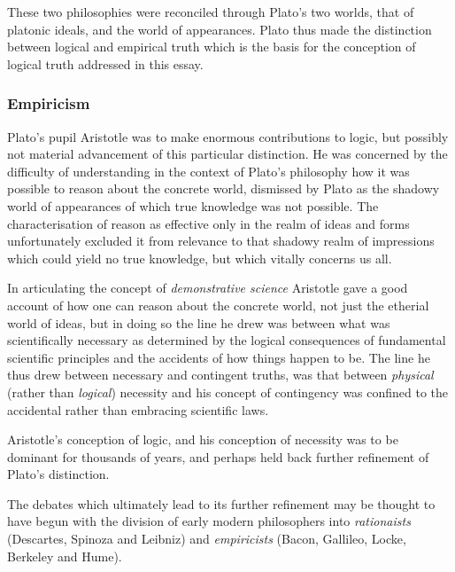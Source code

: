 \documentclass[10pt,titlepage]{article}
\begin{document}
These two philosophies were reconciled through Plato's two worlds, that of platonic ideals, and the world of appearances.
Plato thus made the distinction between logical and empirical truth which is the basis for the conception of logical truth addressed in this essay.

\subsubsection{Empiricism}

Plato's pupil Aristotle was to make enormous contributions to logic, but possibly not material advancement of this particular distinction.
He was concerned by the difficulty of understanding in the context of Plato's philosophy how it was possible to reason about the concrete world, dismissed by Plato as the shadowy world of appearances of which true knowledge was not possible.
The characterisation of reason as effective only in the realm of ideas and forms unfortunately excluded it from relevance to that shadowy realm of impressions which could yield no true knowledge, but which vitally concerns us all.

In articulating the concept of \emph{demonstrative science} Aristotle gave a good account of how one can reason about the concrete world, not just the etherial world of ideas, but in doing so the line he drew was between what was scientifically necessary as determined by the logical consequences of fundamental scientific principles and the accidents of how things happen to be.
The line he thus drew between necessary and contingent truths, was that between \emph{physical} (rather than \emph{logical}) necessity and his concept of contingency was confined to the accidental rather than embracing scientific laws.

Aristotle's conception of logic, and his conception of necessity was to be dominant for thousands of years, and perhaps held back further refinement of Plato's distinction.

The debates which ultimately lead to its further refinement may be thought to have begun with the division of early modern philosophers into \emph{rationaists} (Descartes, Spinoza and Leibniz) and \emph{empiricists} (Bacon, Gallileo, Locke, Berkeley and Hume).

{}



\label{index}
{\twocolumn[]
{\small\printindex}}





\end{document}
